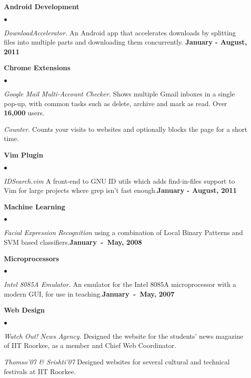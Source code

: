 \documentclass[margin,line]{res}
\newenvironment{list2}{
  \begin{list}{$\bullet$}{%
      \setlength{\itemsep}{0in}
      \setlength{\parsep}{0in} \setlength{\parskip}{0in}
      \setlength{\topsep}{0in} \setlength{\partopsep}{0in} 
      \setlength{\leftmargin}{0.2in}}}{\end{list}}
\begin{document}
\begin{resume}
{\bf Android Development}
\begin{list2}
\item {\em DownloadAccelerator.} An Android app that accelerates downloads by splitting files into multiple parts and downloading them concurrently. \hfill {\bf January - August, 2011}
\end{list2}

{\bf Chrome Extensions}
\begin{list2}
\item {\em Google Mail Multi-Account Checker.} Shows multiple Gmail inboxes in a single pop-up, with common tasks such as delete, archive and mark as read. Over {\bf 16,000} users.
\item {\em Counter.} Counts your visits to websites and optionally blocks the page for a short time.
\end{list2}

{\bf Vim Plugin}
\begin{list2}
\item {\em IDSearch.vim} A front-end to GNU ID utils which adds find-in-files support to Vim for large projects where grep isn't fast enough.\hfill {\bf January - August, 2011}
\end{list2}

{\bf Machine Learning}
\begin{list2}
\item {\em Facial Expression Recognition} using a combination of Local Binary Patterns and SVM based classifiers.\hfill {\bf January~-~May, 2008}
\end{list2}

{\bf Microprocessors}
\begin{list2}
\item {\em Intel 8085A Emulator.} An emulator for the Intel 8085A microprocessor with a modern GUI, for use in teaching.\hfill {\bf January~-~May, 2007}
\end{list2}

{\bf Web Design}
\begin{list2}
\item {\em Watch Out! News Agency.} Designed the website for the students' news magazine of IIT Roorkee, as a member and Chief Web Coordinator.
\item {\em Thomso'07 \& Srishti'07} Designed websites for several cultural and technical festivals at IIT Roorkee.
\end{list2}


\end{resume}
\end{document}
